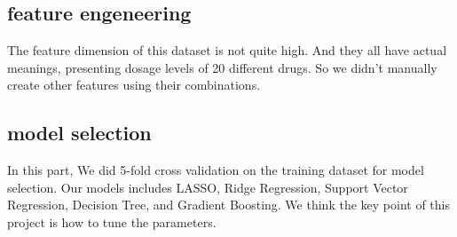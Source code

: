 \documentclass{article}
\begin{document}
\subsection{feature engeneering}
The feature dimension of this dataset is not quite high. And they all have actual meanings, presenting dosage levels of 20 different drugs. So we didn't manually create other features using their combinations.

\subsection{model selection}
In this part, We did 5-fold cross validation on the training dataset for model selection. Our models includes LASSO, Ridge Regression, Support Vector Regression, Decision Tree, and Gradient Boosting. We think the key point of this project is how to tune the parameters.
\end{document}

